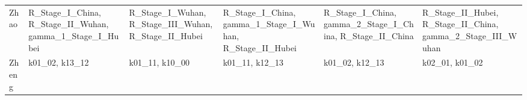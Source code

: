 \begin{longtable}{@{}l>{\raggedright}p{2.6cm}>{\raggedright}p{2.6cm}>{\raggedright}p{2.6cm}>{\raggedright}p{2.6cm}>{\raggedright\arraybackslash}p{2.6cm}@{}}
Zhao & R\_\allowbreak{}Stage\_\allowbreak{}I\_\allowbreak{}China, R\_\allowbreak{}Stage\_\allowbreak{}II\_\allowbreak{}Wuhan, gamma\_\allowbreak{}1\_\allowbreak{}Stage\_\allowbreak{}I\_\allowbreak{}Hubei & R\_\allowbreak{}Stage\_\allowbreak{}I\_\allowbreak{}Wuhan, R\_\allowbreak{}Stage\_\allowbreak{}III\_\allowbreak{}Wuhan, R\_\allowbreak{}Stage\_\allowbreak{}II\_\allowbreak{}Hubei & R\_\allowbreak{}Stage\_\allowbreak{}I\_\allowbreak{}China, gamma\_\allowbreak{}1\_\allowbreak{}Stage\_\allowbreak{}I\_\allowbreak{}Wuhan, R\_\allowbreak{}Stage\_\allowbreak{}II\_\allowbreak{}Hubei & R\_\allowbreak{}Stage\_\allowbreak{}I\_\allowbreak{}China, gamma\_\allowbreak{}2\_\allowbreak{}Stage\_\allowbreak{}I\_\allowbreak{}China, R\_\allowbreak{}Stage\_\allowbreak{}II\_\allowbreak{}China & R\_\allowbreak{}Stage\_\allowbreak{}II\_\allowbreak{}Hubei, R\_\allowbreak{}Stage\_\allowbreak{}II\_\allowbreak{}China, gamma\_\allowbreak{}2\_\allowbreak{}Stage\_\allowbreak{}III\_\allowbreak{}Wuhan \\
Zheng & k01\_\allowbreak{}02, k13\_\allowbreak{}12 & k01\_\allowbreak{}11, k10\_\allowbreak{}00 & k01\_\allowbreak{}11, k12\_\allowbreak{}13 & k01\_\allowbreak{}02, k12\_\allowbreak{}13 & k02\_\allowbreak{}01, k01\_\allowbreak{}02 \\
\bottomrule
\end{longtable}
